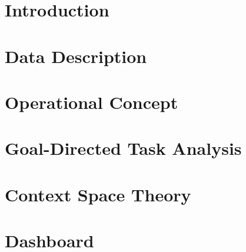 \documentclass[11pt]{report}
\begin{document}


\tableofcontents

\chapter[Introduction]{Introduction}\label{ch:introduction}


\chapter[Data Description]{Data Description}\label{ch:data-description}


\chapter[Operational Concept]{Operational Concept}\label{ch:operationalconcept}


\chapter[Goal-Directed Task Analysis]{Goal-Directed Task Analysis}\label{ch:gdta}


\chapter[Context Space Theory]{Context Space Theory}\label{ch:cst}


\chapter[Dashboard]{Dashboard}\label{ch:dashboard}




\listoffigures
\listoftables
\end{document}
